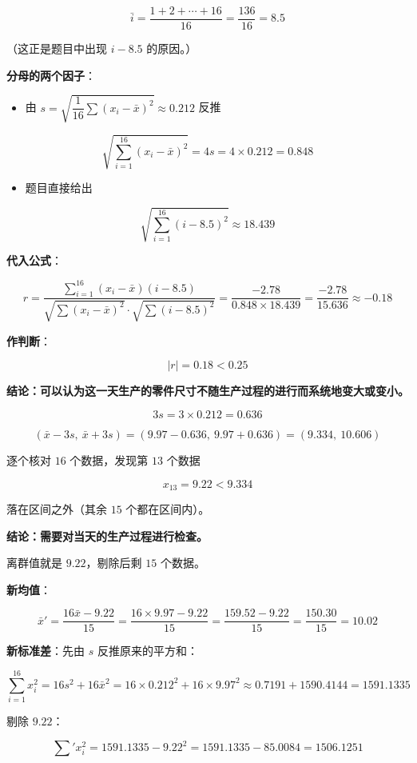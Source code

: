 \[\bar i=\frac{1+2+\cdots+16}{16}=\frac{136}{16}=8.5\]

（这正是题目中出现 $i-8.5$ 的原因。）

\textbf{分母的两个因子}：

\begin{itemize}
\item 由 $s=\sqrt{\dfrac1{16}\sum\left(x_i-\bar x\right)^{2}}\approx0.212$ 反推
\end{itemize}
\[\sqrt{\sum_{i=1}^{16}\left(x_i-\bar x\right)^{2}}=4s=4\times0.212=0.848\]
\begin{itemize}
\item 题目直接给出
\end{itemize}
\[\sqrt{\sum_{i=1}^{16}(i-8.5)^{2}}\approx18.439\]

\textbf{代入公式}：

\[r=\frac{\sum\limits_{i=1}^{16}\left(x_i-\bar x\right)(i-8.5)}{\sqrt{\sum\left(x_i-\bar x\right)^{2}}\cdot\sqrt{\sum(i-8.5)^{2}}}=\frac{-2.78}{0.848\times18.439}=\frac{-2.78}{15.636}\approx-0.18\]

\textbf{作判断}：

\[|r|=0.18<0.25\]

\textbf{结论：可以认为这一天生产的零件尺寸不随生产过程的进行而系统地变大或变小。}


\[3s=3\times0.212=0.636\]

\[(\bar x-3s,\ \bar x+3s)=(9.97-0.636,\ 9.97+0.636)=(9.334,\ 10.606)\]

逐个核对 $16$ 个数据，发现第 $13$ 个数据

\[x_{13}=9.22<9.334\]

落在区间之外（其余 $15$ 个都在区间内）。

\textbf{结论：需要对当天的生产过程进行检查。}


离群值就是 $9.22$，剔除后剩 $15$ 个数据。

\textbf{新均值}：

\[\bar x'=\frac{16\bar x-9.22}{15}=\frac{16\times9.97-9.22}{15}=\frac{159.52-9.22}{15}=\frac{150.30}{15}=10.02\]

\textbf{新标准差}：先由 $s$ 反推原来的平方和：

\[\sum_{i=1}^{16}x_i^{2}=16s^{2}+16\bar x^{2}=16\times0.212^{2}+16\times9.97^{2}\approx0.7191+1590.4144=1591.1335\]

剔除 $9.22$：

\[\sum{}'x_i^{2}=1591.1335-9.22^{2}=1591.1335-85.0084=1506.1251\]


